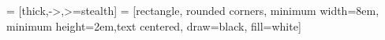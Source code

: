 \usepackage{tikz}
\usetikzlibrary{shapes,arrows}
 = [thick,->,>=stealth]
 = [rectangle, rounded corners, minimum width=8em, minimum height=2em,text centered, draw=black, fill=white]
